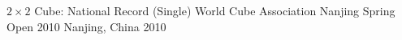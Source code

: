 


\begin{cvhonors}

  \cvhonor
    {$2 \times 2$ Cube: National Record (Single)} %
    {World Cube Association Nanjing Spring Open 2010} %
    {Nanjing, China} %
    {2010} %
    {}

\end{cvhonors}

